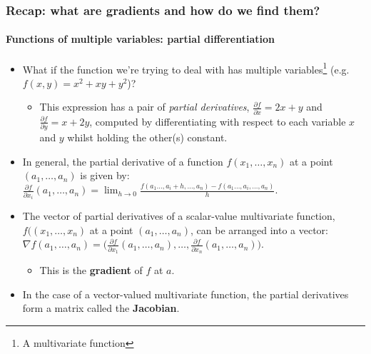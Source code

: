 \documentclass[\beamerclass]{beamer}
\begin{document}
\begin{frame}
\frametitle{Recap: what are gradients and how do we find them?}
\framesubtitle{Functions of multiple variables: partial differentiation}

\begin{itemize}
	\item What if the function we're trying to deal with has multiple variables\footnote{A multivariate function} (e.g. $f(x, y) = x^2 + xy + y^2$)?
	\begin{itemize}
		\item<+-> This expression has a pair of \emph{partial derivatives}, $\frac{\partial f}{\partial x} = 2x+y$ and $\frac{\partial f}{\partial y} = x + 2y$, computed by differentiating with respect to each variable $x$ and $y$ whilst holding the other(s) constant.
	\end{itemize}
	\item<+-> In general, the partial derivative of a function $f(x_1,\dots,x_n)$ at a point $(a_1,\dots,a_n)$ is given by: \\ $\frac{\partial f}{\partial x_i}(a_1,\dots,a_n) = \lim_{h\to0}\frac{f(a_1\dots,a_i+h,\dots,a_n)-f(a_1\dots,a_i,\dots,a_n)}{h}$.
	\item<+-> The vector of partial derivatives of a scalar-value multivariate function, $f((x_1,\dots,x_n)$ at a point $(a_1,\dots,a_n)$, can be arranged into a vector:
	$\nabla f(a_1,\dots,a_n) = \big(\frac{\partial f}{\partial x_1}(a_1,\dots,a_n), \dots, \frac{\partial f}{\partial x_n}(a_1,\dots,a_n) \big)$.
	\begin{itemize}
		\item<+-> This is the \textbf{gradient} of $f$ at $a$.
	\end{itemize}
	\item<+-> In the case of a vector-valued multivariate function, the partial derivatives form a matrix called the \textbf{Jacobian}.
\end{itemize}
\end{frame}
\end{document}
